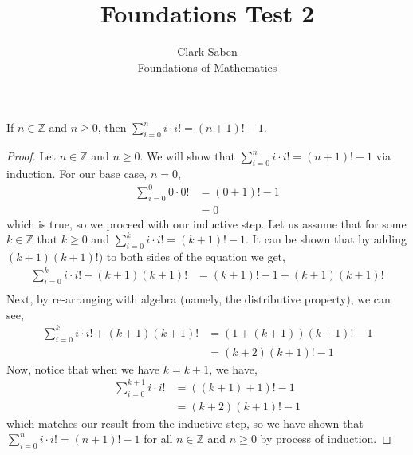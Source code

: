 \documentclass[12pt]{article}
\newenvironment{theorem}[2][Theorem]{\begin{trivlist}
\item[\hskip \labelsep {\bfseries #1}\hskip \labelsep {\bfseries #2.}]}{\end{trivlist}}
\begin{document}
 
 
\title{Foundations Test 2}%
\author{Clark Saben\\ %
Foundations of Mathematics} %
 
\maketitle

\section{}
\begin{theorem}1
	If $n \in \mathbb{Z}$ and $n \geq 0$, then $\sum_{i=0}^{n}i\cdot i! = \left(n+1 \right)!-1$.
\end{theorem}
\begin{proof}
    Let $n \in \mathbb{Z}$ and $n \geq 0$. We will show that $\sum_{i=0}^{n}i\cdot i! = \left(n+1 \right)!-1$ via induction. For our base case, $n=0$,
    \begin{align*}
        \sum_{i=0}^{0}0\cdot 0! &= (0+1)!-1\\
	&= 0
    \end{align*}
    which is true, so we proceed with our inductive step. Let us assume that for some $k \in \mathbb{Z}$ 
    that $k \geq 0$ and $\sum_{i=0}^{k}i\cdot i! = \left(k+1 \right)!-1$. It can be shown that by adding
    $(k+1)(k+1)!)$ to both sides of the equation we get,
    \begin{align*}
	\sum_{i=0}^{k}i\cdot i! + (k+1)(k+1)! &= \left(k+1 \right)!-1 + (k+1)(k+1)!\\
    \end{align*}
    Next, by re-arranging with algebra (namely, the distributive property), we can see,
    \begin{align*}
		\sum_{i=0}^{k}i\cdot i! + (k+1)(k+1)! &= (1+(k+1))(k+1)!-1\\
						      &= (k+2)(k+1)!-1
\end{align*}
Now, notice that when we have $k=k+1$, we have,
\begin{align*}
	\sum_{i=0}^{k+1}i\cdot i! &= ((k+1)+1)!-1\\
	&= (k+2)(k+1)!-1
\end{align*}
which matches our result from the inductive step, so we have shown that\\ $\sum_{i=0}^{n}i\cdot i! = \left(n+1 \right)!-1$ for all $n \in \mathbb{Z}$ and $n \geq 0$
by process of induction.
\end{proof}
\end{document}

